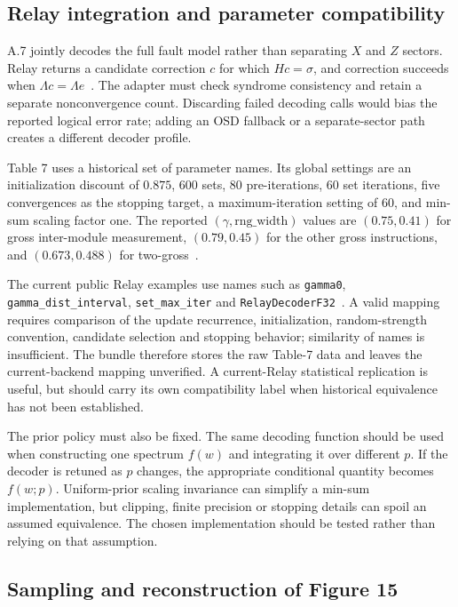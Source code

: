 \documentclass[11pt,a4paper]{article}
\begin{document}
\subsection{Relay integration and parameter compatibility}

A.7 jointly decodes the full fault model rather than separating $X$ and $Z$ sectors. Relay returns a candidate correction $c$ for which $Hc=\sigma$, and correction succeeds when $\Lambda c=\Lambda e$~\cite{tdg,relay}. The adapter must check syndrome consistency and retain a separate nonconvergence count. Discarding failed decoding calls would bias the reported logical error rate; adding an OSD fallback or a separate-sector path creates a different decoder profile.

Table 7 uses a historical set of parameter names. Its global settings are an initialization discount of $0.875$, $600$ sets, $80$ pre-iterations, $60$ set iterations, five convergences as the stopping target, a maximum-iteration setting of $60$, and min-sum scaling factor one. The reported $(\gamma,\mathrm{rng\_width})$ values are $(0.75,0.41)$ for gross inter-module measurement, $(0.79,0.45)$ for the other gross instructions, and $(0.673,0.488)$ for two-gross~\cite{tdg}.

The current public Relay examples use names such as \texttt{gamma0}, \texttt{gamma\_dist\_interval}, \texttt{set\_max\_iter} and \texttt{RelayDecoderF32}~\cite{relaysoftware}. A valid mapping requires comparison of the update recurrence, initialization, random-strength convention, candidate selection and stopping behavior; similarity of names is insufficient. The bundle therefore stores the raw Table-7 data and leaves the current-backend mapping unverified. A current-Relay statistical replication is useful, but should carry its own compatibility label when historical equivalence has not been established.

The prior policy must also be fixed. The same decoding function should be used when constructing one spectrum $f(w)$ and integrating it over different $p$. If the decoder is retuned as $p$ changes, the appropriate conditional quantity becomes $f(w;p)$. Uniform-prior scaling invariance can simplify a min-sum implementation, but clipping, finite precision or stopping details can spoil an assumed equivalence. The chosen implementation should be tested rather than relying on that assumption.

\subsection{Sampling and reconstruction of Figure 15}
\end{document}
